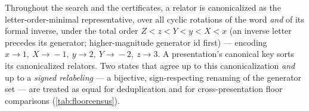 Throughout the search and the certificates, a relator is canonicalized as the
letter-order-minimal representative, over all cyclic rotations of the word \emph{and} of
its formal inverse, under the total order $Z<z<Y<y<X<x$ (an inverse letter precedes its
generator; higher-magnitude generator id first) --- encoding $x\!\to\!1,\ X\!\to\!-1,\
y\!\to\!2,\ Y\!\to\!-2,\ z\!\to\!3$. A presentation's canonical key sorts its canonicalized
relators. Two states that agree up to this canonicalization \emph{and} up to a \emph{signed
relabeling} --- a bijective, sign-respecting renaming of the generator set --- are treated as
equal for deduplication and for cross-presentation floor comparisons (\ref{tab:floorcensus}).
